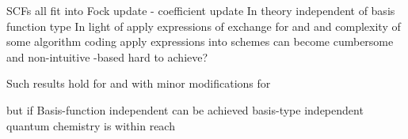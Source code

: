 SCFs all fit into Fock update - coefficient update
In theory independent of basis function type
In light of apply expressions of exchange for \FE and \CS
and complexity of some \SCF algorithm 
coding apply expressions into \SCF schemes can become cumbersome
and non-intuitive
\contract-based \SCF hard to achieve?

Such results hold for \HF and with minor modifications for \DFT

but if Basis-function independent \SCF can be achieved
basis-type independent quantum chemistry is within reach

